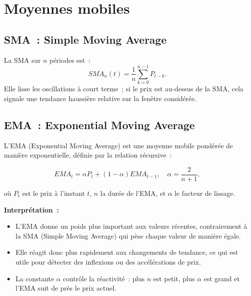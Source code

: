 \documentclass[12pt,a4paper]{article}
\begin{document}
\section{Moyennes mobiles}

\subsection{SMA~: Simple Moving Average}
La SMA sur \(n\) périodes est~:
\begin{equation}
SMA_n(t) = \frac{1}{n} \sum_{k=0}^{n-1} P_{t-k}.
\end{equation}
Elle lisse les oscillations à court terme~; si le prix est au-dessus
de la SMA, cela signale une tendance haussière relative sur la fenêtre
considérée.

\subsection{EMA~: Exponential Moving Average}
L'EMA (Exponential Moving Average) est une moyenne mobile pondérée
de manière exponentielle, définie par la relation récursive~:

\begin{equation}
    EMA_t = \alpha P_t + (1-\alpha) EMA_{t-1}, \quad
    \alpha = \frac{2}{n+1},
\end{equation}

où $P_t$ est le prix à l'instant $t$, $n$ la durée de l'EMA, et $\alpha$ 
le facteur de lissage.

\newpage
\textbf{Interprétation~:}
\begin{itemize}
  \item L'EMA donne un poids plus important aux valeurs récentes,
        contrairement à la SMA (Simple Moving Average) qui pèse chaque
        valeur de manière égale.
  \item Elle réagit donc plus rapidement aux changements de tendance,
 ce qui est utile pour détecter des inflexions ou des accélérations de prix.
  \item La constante $\alpha$ contrôle la réactivité~: plus $n$ est petit,
        plus $\alpha$ est grand et l'EMA suit de près le prix actuel.
\end{itemize}
\end{document}
